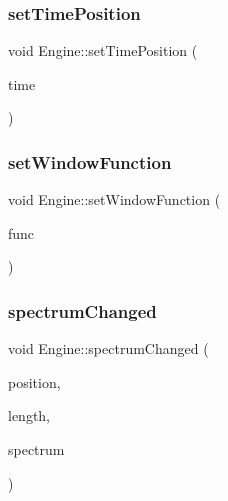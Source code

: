 \hypertarget{class_engine_a52d2f257b439735853144f7cb4199f86}{}\label{class_engine_a52d2f257b439735853144f7cb4199f86} 
\subsubsection{\texorpdfstring{set\+Time\+Position}{setTimePosition}}
{\footnotesize\ttfamily void Engine\+::set\+Time\+Position (\begin{DoxyParamCaption}\item[{qint64}]{time }\end{DoxyParamCaption})\hspace{0.3cm}{\ttfamily [slot]}}

\hypertarget{class_engine_ad36cd20d882c533e02cf6164cbc6e774}{}\label{class_engine_ad36cd20d882c533e02cf6164cbc6e774} 
\subsubsection{\texorpdfstring{set\+Window\+Function}{setWindowFunction}}
{\footnotesize\ttfamily void Engine\+::set\+Window\+Function (\begin{DoxyParamCaption}\item[{\hyperlink{spectrum_8h_adae4545e1609513867a86cc5e91fc1d4}{Window\+Function}}]{func }\end{DoxyParamCaption})\hspace{0.3cm}{\ttfamily [slot]}}

\hypertarget{class_engine_a99575be39ebf22f90a48ab2c23c2d482}{}\label{class_engine_a99575be39ebf22f90a48ab2c23c2d482} 
\subsubsection{\texorpdfstring{spectrum\+Changed}{spectrumChanged}}
{\footnotesize\ttfamily void Engine\+::spectrum\+Changed (\begin{DoxyParamCaption}\item[{qint64}]{position,  }\item[{qint64}]{length,  }\item[{const \hyperlink{class_frequency_spectrum}{Frequency\+Spectrum} \&}]{spectrum }\end{DoxyParamCaption})\hspace{0.3cm}{\ttfamily [signal]}}

